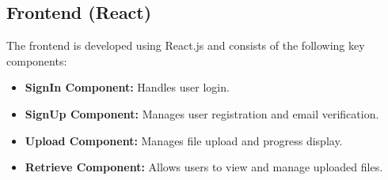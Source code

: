 \documentclass[12pt,a4paper]{report}
\begin{document}
\subsection{Frontend (React)}
\par
The frontend is developed using React.js and consists of the following key components:
\begin{itemize}
   \item \textbf{SignIn Component:} Handles user login.
   \item \textbf{SignUp Component:} Manages user registration and email verification.
   \item \textbf{Upload Component:} Manages file upload and progress display.
   \item \textbf{Retrieve Component:} Allows users to view and manage uploaded files.
\end{itemize}
\end{document}
